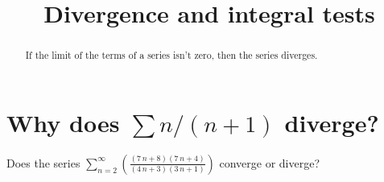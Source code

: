 \documentclass{ximera}
\title{Divergence and integral tests}
\begin{document}
\begin{abstract}
  If the limit of the terms of a series isn't zero, then the series diverges.
\end{abstract}

\maketitle

\section{Why does $\sum n/(n+1)$ diverge?}


\begin{question}
  Does the series \(\displaystyle\sum_{n=2}^\infty \left( \displaystyle\frac{{\left(7 \, n + 8\right)} {\left(7 \, n + 4\right)}}{{\left(4 \, n + 3\right)} {\left(3 \, n + 1\right)}} \right)\) converge or diverge?


\end{question}
\end{document}
